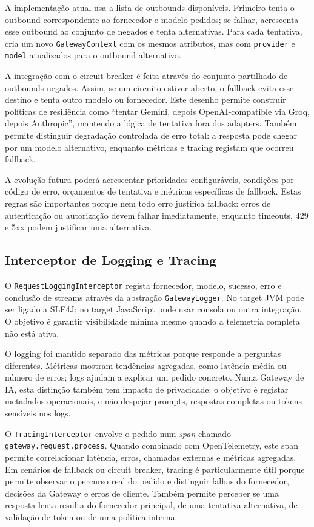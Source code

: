 \documentclass[11pt,a4paper]{report}
\begin{document}
    A implementação atual usa a lista de outbounds disponíveis. Primeiro tenta o outbound correspondente ao fornecedor e modelo pedidos; se falhar, acrescenta esse outbound ao conjunto de negados e tenta alternativas. Para cada tentativa, cria um novo \texttt{GatewayContext} com os mesmos atributos, mas com \texttt{provider} e \texttt{model} atualizados para o outbound alternativo.

    A integração com o circuit breaker é feita através do conjunto partilhado de outbounds negados. Assim, se um circuito estiver aberto, o fallback evita esse destino e tenta outro modelo ou fornecedor. Este desenho permite construir políticas de resiliência como ``tentar Gemini, depois OpenAI-compatible via Groq, depois Anthropic'', mantendo a lógica de tentativa fora dos adapters. Também permite distinguir degradação controlada de erro total: a resposta pode chegar por um modelo alternativo, enquanto métricas e tracing registam que ocorreu fallback.

    A evolução futura poderá acrescentar prioridades configuráveis, condições por código de erro, orçamentos de tentativa e métricas específicas de fallback. Estas regras são importantes porque nem todo erro justifica fallback: erros de autenticação ou autorização devem falhar imediatamente, enquanto timeouts, 429 e 5xx podem justificar uma alternativa.

    \subsection{Interceptor de Logging e Tracing}
    O \texttt{RequestLoggingInterceptor} regista fornecedor, modelo, sucesso, erro e conclusão de streams através da abstração \texttt{GatewayLogger}. No target JVM pode ser ligado a SLF4J; no target JavaScript pode usar consola ou outra integração. O objetivo é garantir visibilidade mínima mesmo quando a telemetria completa não está ativa.

    O logging foi mantido separado das métricas porque responde a perguntas diferentes. Métricas mostram tendências agregadas, como latência média ou número de erros; logs ajudam a explicar um pedido concreto. Numa Gateway de IA, esta distinção também tem impacto de privacidade: o objetivo é registar metadados operacionais, e não despejar prompts, respostas completas ou tokens sensíveis nos logs.

    O \texttt{TracingInterceptor} envolve o pedido num \textit{span} chamado \texttt{gateway.request.process}. Quando combinado com OpenTelemetry, este span permite correlacionar latência, erros, chamadas externas e métricas agregadas. Em cenários de fallback ou circuit breaker, tracing é particularmente útil porque permite observar o percurso real do pedido e distinguir falhas do fornecedor, decisões da Gateway e erros de cliente. Também permite perceber se uma resposta lenta resulta do fornecedor principal, de uma tentativa alternativa, de validação de token ou de uma política interna.
\end{document}
